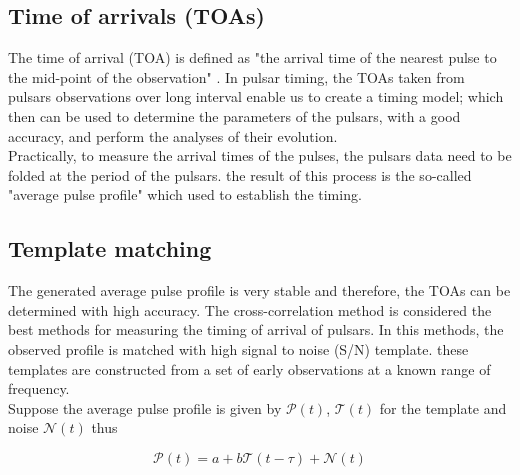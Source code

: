 

\subsection{Time of arrivals (TOAs)}
The time of arrival (TOA) is defined as "the arrival time of the nearest pulse to the mid-point of the observation" \citet{lorimer2005handbook}. In pulsar timing, the TOAs taken from pulsars observations over long interval enable us to create a timing model; which then can be used to determine the parameters of the pulsars, with a good accuracy, and perform the analyses of their evolution.\\
Practically, to measure the arrival times of the pulses, the pulsars data need to be folded at the period of the pulsars. the result of this process is the so-called "average pulse profile" which used to establish the timing.

\subsection{Template matching}
\label{cross-correlation}
The generated average pulse profile is very stable and therefore, the TOAs can be determined with high accuracy. The cross-correlation method is considered the best methods for measuring the timing of arrival of pulsars. In this methods, the observed profile is matched with high signal to noise (S/N) template. these templates are constructed from a set of early observations at a known range of frequency.\\
Suppose the average pulse profile is given by $\mathcal{P}(t)$, $\mathcal{T}(t)$ for the template and noise $\mathcal{N}(t)$ thus

\begin{equation}
\label{cross-cor}
\mathcal{P}(t) =  a + b \mathcal{T}(t - \tau) + \mathcal{N}(t)  
\end{equation}

